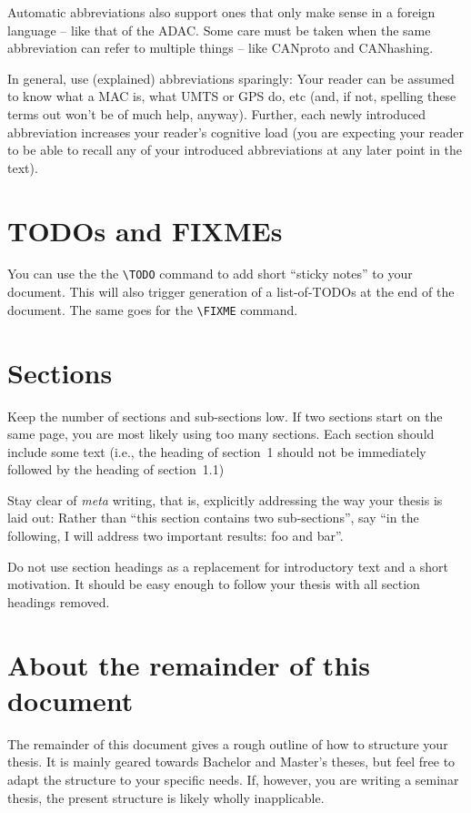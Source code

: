 \documentclass[]{ccs-thesis}
\begin{document}
{Automatic abbreviations also support ones that only make sense in a foreign language -- like that of the \ac{ADAC}.
Some care must be taken when the same abbreviation can refer to multiple things -- like \ac{CANproto} and \ac{CANhashing}.

In general, use (explained) abbreviations sparingly:
Your reader can be assumed to know what a MAC is, what UMTS or GPS do, etc (and, if not, spelling these terms out won't be of much help, anyway).
Further, each newly introduced abbreviation increases your reader's cognitive load (you are expecting your reader to be able to recall any of your introduced abbreviations at any later point in the text).


\section{TODOs and FIXMEs}

You can use the the \verb|\TODO| command to add short ``sticky notes'' to your document.
This will also trigger generation of a list-of-TODOs at the end of the document.
The same goes for the \verb|\FIXME| command.


\section{Sections}

Keep the number of sections and sub-sections low.
If two sections start on the same page, you are most likely using too many sections.
Each section should include some text (i.e., the heading of section~1 should not be immediately followed by the heading of section~1.1)

Stay clear of \emph{meta} writing, that is, explicitly addressing the way your thesis is laid out:
Rather than ``this section contains two sub-sections'', say ``in the following, I will address two important results: foo and bar''.

Do not use section headings as a replacement for introductory text and a short motivation.
It should be easy enough to follow your thesis with all section headings removed.

\section{About the remainder of this document}
The remainder of this document gives a rough outline of how to structure your thesis.
It is mainly geared towards Bachelor and Master's theses, but feel free to adapt the structure to your specific needs.
If, however, you are writing a seminar thesis, the present structure is likely wholly inapplicable.
}

\cleardoublepage

\listofabbreviations
\clearpage

\listoffigures
\clearpage

\listoftables
\clearpage

\printbibliography
\end{document}
